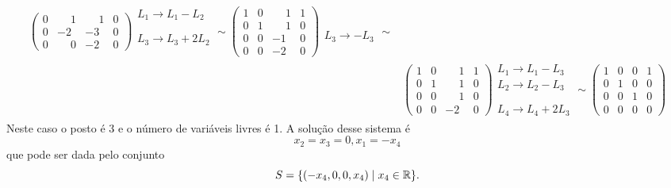 \begin{exemplo}
\begin{solucao}
\begin{enumerate}
\begin{align*}
\begin{pmatrix}
                    0 &\phantom{-} 1 &\phantom{-} 1 & 0\\
                    0 & -2 & -3 & 0\\
                    0 &\phantom{-} 0 & -2 & 0
                \end{pmatrix}
                \begin{array}{l}
                    L_1 \to L_1 - L_2\\\phantom{x}\\L_3 \to L_3 + 2L_2\\\phantom{x}
                \end{array}\sim
                \begin{pmatrix}
                    1 & 0 &\phantom{-} 1 & 1\\
                    0 & 1 &\phantom{-} 1 & 0\\
                    0 & 0 & -1 & 0\\
                    0 & 0 & -2 & 0
                \end{pmatrix}
                \begin{array}{l}
                    \phantom{x}\\\phantom{x}\\L_3 \to -L_3\\\phantom{x}
                \end{array}\sim\\
                &\begin{pmatrix}
                    1 & 0 &\phantom{-} 1 & 1\\
                    0 & 1 &\phantom{-} 1 & 0\\
                    0 & 0 &\phantom{-} 1 & 0\\
                    0 & 0 & -2 & 0
                \end{pmatrix}
                \begin{array}{l}
                    L_1 \to L_1 - L_3\\L_2 \to L_2 - L_3\\\phantom{x}\\L_4 \to L_4 + 2L_3
                \end{array}\sim
                \begin{pmatrix}
                    1 & 0 & 0 & 1\\
                    0 & 1 & 0 & 0\\
                    0 & 0 & 1 & 0\\
                    0 & 0 & 0 & 0
                \end{pmatrix}
            \end{align*}
            Neste caso o posto é 3 e o número de variáveis livres é 1. A solução desse sistema é
            \[
                x_2 = x_3 = 0, x_1 = -x_4
            \]
            que pode ser dada pelo conjunto
            \[
                S = \{(-x_4, 0, 0, x_4) \mid x_4 \in \mathbb{R}\}.
            \]

    \end{enumerate}
\end{solucao}
\end{exemplo}
